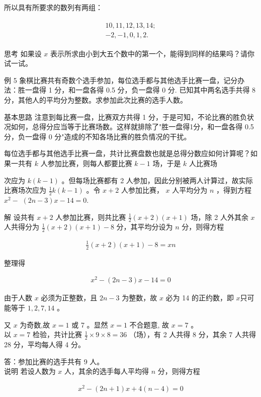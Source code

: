 \documentclass[10pt]{article}
\begin{document}
所以具有所要求的数列有两组：

\begin{align*}
\begin{gathered}
10,11,12,13,14 ; \\
-2,-1,0,1,2 .
\end{gathered}
\end{align*}

思考 如果设 $x$ 表示所求由小到大五个数中的第一个，能得到同样的结果吗？请你试一试。

例 5 象棋比赛共有奇数个选手参加，每位选手都与其他选手比赛一盘，记分办法：胜一盘得 1 分，和一盘各得 0.5 分，负一盘得 0 分. 已知其中两名选手共得 8 分，其他人的平均分为整数。求参加此次比赛的选手人数。

基本思路 注意到每比赛一盘，比赛双方共得 1 分，于是可知，不论比赛的胜负状况如何，总得分应当等于比赛场数。这样就排除了"胜一盘得1分，和一盘各得 0.5 分，负一盘得 0 分"造成的不知各场比赛的胜负情况的干扰。

每位选手都与其他选手比赛一盘，共计比赛盘数也就是总得分数应如何计算呢？如果一共有 $k$ 人参加比赛，则每人都要比赛 $k-1$ 场，于是 $k$ 人比赛场

次应为 $k(k-1)$ 。但每场比赛都有 2 人参加，因此分别被两人计算过，故实际比赛场次应为 $\frac{1}{2} k(k-1)$ 。令 $x+2$ 人参加比赛， $x$ 人平均分为 $n$ ，得到方程 $x^{2}-$ $(2 n-3) x-14=0$.

解 设共有 $x+2$ 人参加比赛，则共比赛 $\frac{1}{2}(x+2)(x+1)$ 场，除 2 人外其余 $x$ 人共得分为 $\frac{1}{2}(x+2)(x+1)-8$ 分，其平均分设为 $n$ 分，则得方程

\begin{align*}
\frac{1}{2}(x+2)(x+1)-8=x n
\end{align*}

整理得

\begin{align*}
x^{2}-(2 n-3) x-14=0
\end{align*}

由于人数 $x$ 必须为正整数，且 $2 n-3$ 为整数，故 $x$ 必为 14 的正约数，即 $x$只可能等于 $1,2,7,14$ 。

又 $x$ 为奇数,故 $x=1$ 或 7 。显然 $x=1$ 不合题意, 故 $x=7$ 。\\
以 $x=7$ 检验，共计比赛 $\frac{1}{2} \times 9 \times 8=36$ （场），有 2 人共得 8 分，其余 7 人共得 28 分，平均每人得 4 分。

答：参加比赛的选手共有 9 人。\\
说明 若设人数为 $x$ 人，其余的选手每人平均得 $n$ 分，则得方程

\begin{align*}
x^{2}-(2 n+1) x+4(n-4)=0
\end{align*}
\end{document}
